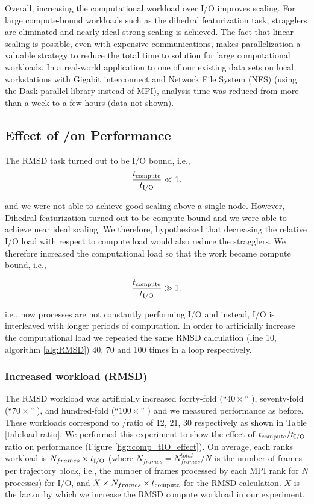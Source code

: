 Overall, increasing the computational workload over I/O improves scaling. For large compute-bound workloads such as the dihedral
featurization task, stragglers are eliminated and nearly ideal strong scaling is achieved. 
The fact that linear scaling is possible, even with expensive communications, makes parallelization a valuable strategy to reduce
the total time to solution for large computational workloads. In a real-world application to one of our existing data sets on local
workstations with Gigabit interconnect and Network File System (NFS) (using the Dask parallel library instead of MPI), analysis time was reduced from more
than a week to a few hours (data not shown).

\subsection{Effect of \tcomp/\tIO on Performance}
\label{bound}

The RMSD task turned out to be I/O bound, i.e.,
\begin{gather*}
  \frac{{t}_{\text{compute}}}{{t}_{\text{I/O}}} \ll 1.
\end{gather*}

and we were not able to achieve good scaling above a single node. 
However, Dihedral featurization turned out to be compute bound and we were able to achieve near ideal scaling. 
We therefore, hypothesized that decreasing the relative I/O load with respect to compute load would also reduce the stragglers. 
We therefore increased the computational load so that the work became compute bound, i.e.,

\begin{gather*}
  \frac{{t}_{\text{compute}}}{{t}_{\text{I/O}}} \gg 1.
\end{gather*}

i.e., now processes are not constantly performing I/O and instead, I/O is interleaved with longer periods of computation.
In order to artificially increase the computational load we repeated the same RMSD calculation (line 10, algorithm \ref{alg:RMSD}) 40, 70 and 100 times in a loop respectively.

\subsubsection{Increased workload (RMSD)}
The RMSD workload was artificially increased forrty-fold (``$40\times$'' ), seventy-fold (``$70\times$'' ), and hundred-fold (``$100\times$'' ) and we measured performance as before. 
These workloads correspond to \tcomp/\tIO ratio of 12, 21, 30 respectively as shown in Table \ref{tab:load-ratio}.
We performed this experiment to show the effect of ${t}_{\text{compute}}/{t}_{\text{I/O}}$ ratio on performance (Figure \ref{fig:tcomp_tIO_effect}).
On average, each rank\textsc{}s workload is $N_{frames} \times {t}_{\text{I/O}} $ (where $N_{frames}=N_{frames}^{total}/N$ is the
number of frames per trajectory block, i.e., the number of frames
processed by each MPI rank for $N$ processes) for I/O, and
$X \times N_{frames} \times {t}_{\text{compute}}$ for the RMSD calculation. 
$X$ is the factor by which we increase the RMSD compute workload in our experiment.

